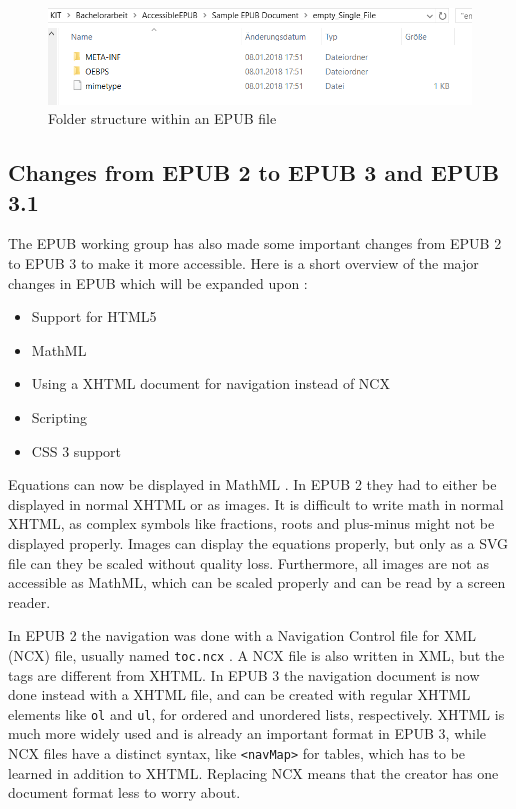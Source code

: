 \begin{figure}
	\includegraphics[width=\linewidth]{figures/epubFolderStructure.png}
	\caption{Folder structure within an EPUB file}
	\label{fig:epubFolderStructure}
\end{figure}

\subsection{Changes from EPUB 2 to EPUB 3 and EPUB 3.1}

The EPUB working group has also made some important changes from EPUB 2 to EPUB 3  to make it more accessible. Here is a short overview of the major changes in EPUB  which will be expanded upon \cite{EPUB30changes,EPUB31changes}:
\begin{itemize}
	\item Support for HTML5
	\item MathML
	\item Using a XHTML document for navigation instead of NCX
	\item Scripting
	\item CSS 3 support
\end{itemize}

Equations can now be displayed in MathML \cite{EPUB30changes}. In EPUB 2 they had to either be displayed in normal XHTML or as images. It is difficult to write math in normal XHTML, as complex symbols like fractions, roots and plus-minus might not be displayed properly. Images can display the equations properly, but only as a SVG file can they be scaled without quality loss. Furthermore, all images are not as accessible as MathML, which can be scaled properly and can be read by a screen reader.

In EPUB 2 the navigation was done with a  Navigation Control file for XML (NCX) file, usually named \lstinline|toc.ncx| \cite{EPUB3bp}. A NCX file is also written in XML, but the tags are different from XHTML. In EPUB 3 the navigation document is now done instead with a XHTML file, and can be created with regular XHTML elements like \lstinline|ol| and \lstinline|ul|, for ordered and unordered lists, respectively. XHTML is much more widely used and is already an important format in EPUB 3, while NCX files have a distinct syntax, like \lstinline|<navMap>| for tables, which has to be learned in addition to XHTML.  Replacing NCX means that the creator has one document format less to worry about.

